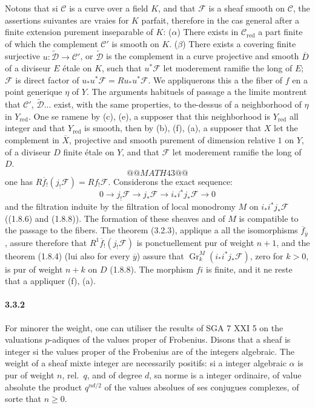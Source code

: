 \documentclass[12pt,a4paper]{article}
\theoremstyle{plain}
\theoremstyle{definition}
\theoremstyle{remark}
\DeclareMathOperator{\Gr}{Gr}
\begin{document}
Notons that si $\mathscr{C}$ is a curve over a field $K$, and that $\mathscr{F}$ is a sheaf smooth on $\mathscr{C}$, the assertions suivantes are vraies for $K$ parfait, therefore in the cas general after a finite extension purement inseparable of $K$: ($\alpha$) There exists in $\mathscr{C}_{\text{red}}$ a part finite of which the complement $\mathscr{C}'$ is smooth on $K$. ($\beta$) There exists a covering finite surjective $u : \widetilde{\mathscr{D}} \to \mathscr{C}'$, or $\widetilde{\mathscr{D}}$ is the complement in a curve projective and smooth $\overline{D}$ of a diviseur $E$ étale on $K$, such that $u^*\mathscr{F}$ let moderement ramifie the long of $E$; $\mathscr{F}$ is direct factor of $u_* u^*\mathscr{F} = Ru_* u^*\mathscr{F}$. We appliquerons this a the fiber of $f$ en a point generique $\eta$ of $Y$. The arguments habituels of passage a the limite montrent that $\mathscr{C}'$, $\widetilde{\mathscr{D}}$... exist, with the same properties, to the-dessus of a neighborhood of $\eta$ in $Y_{\text{red}}$. One se ramene by (c), (e), a supposer that this neighborhood is $Y_{\text{red}}$ all integer and that $Y_{\text{red}}$ is smooth, then by (b), (f), (a), a supposer that $X$ let the complement in $\overline{X}$, projective and smooth purement of dimension relative $1$ on $Y$, of a diviseur $D$ finite étale on $Y$, and that $\mathscr{F}$ let moderement ramifie the long of $D$.
\[
@@MATH43@@
\]
one has $R\overline{f}_! (j_! \mathscr{F}) = Rf_! \mathscr{F}$. Considerons the exact sequence:
\[ 0 \to j_! \mathscr{F} \to j_* \mathscr{F} \to i_* i^* j_* \mathscr{F} \to 0 \]
and the filtration induite by the filtration of local monodromy $M$ on $i_* i^* j_* \mathscr{F}$ ((1.8.6) and (1.8.8)). The formation of these sheaves and of $M$ is compatible to the passage to the fibers. The theorem (3.2.3), applique a all the isomorphisms $\overline{f}_{\overline{y}}$, assure therefore that $R^1 \overline{f}_! (j_! \mathscr{F})$ is ponctuellement pur of weight $n + 1$, and the theorem (1.8.4) (lui also for every $\overline{y}$) assure that $\Gr_k^M (i_* i^* j_* \mathscr{F})$, zero for $k > 0$, is pur of weight $n + k$ on $D$ (1.8.8). The morphism $fi$ is finite, and it ne reste that a appliquer (f), (a).

\paragraph{3.3.2}
For minorer the weight, one can utiliser the results of SGA 7 XXI 5 on the valuations $p$-adiques of the values proper of Frobenius. Disons that a sheaf is integer si the values proper of the Frobenius are of the integers algebraic. The weight of a sheaf mixte integer are necessarily positifs: si a integer algebraic $\alpha$ is pur of weight $n$, rel.~$q$, and of degree $d$, sa norme is a integer ordinaire, of value absolute the product $q^{nd/2}$ of the values absolues of ses conjugues complexes, of sorte that $n \geq 0$.
\end{document}
